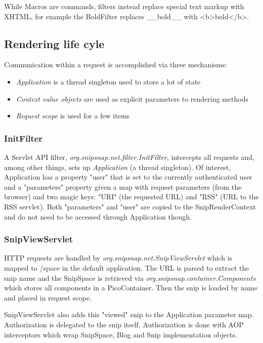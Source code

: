 \documentclass[a4paper,pdftex]{article}
\begin{document}
While Macros are commands, filters instead replace special text markup with
XHTML, for example the BoldFilter replaces \_\_bold\_\_ with <b>bold</b>.

\subsection{Rendering life cyle}

Communication within a request is accomplished via three mechanisms:
\begin{itemize}
\item \textit{Application} is a thread singleton used to store a lot of state
\item \textit{Context value objects} are used as explicit parameters to rendering methods
\item \textit{Request scope} is used for a few items
\end{itemize}

\subsubsection{InitFilter}
A Servlet API filter, \textit{org.snipsnap.net.filter.InitFilter}, intercepts all requests and, 
among other things, sets up \textit{Application} (a thread singleton).  
Of interest, Application has a property "user" that is set to the currently authenticated user 
and a "parameters" property given a map with request parameters (from the browser) 
and two magic keys: "URI" (the requested URL) and "RSS" (URL to the RSS servlet). 
Both "parameters" and "user" are copied to the SnipRenderContext and do not need
to be accessed through Application though.

\subsubsection{SnipViewServlet}
HTTP requests are handled by \textit{org.snipsnap.net.SnipViewServlet} which is
mapped to /space in the default application.  The URL is parsed to extract the snip name and
the SnipSpace is retrieved via \textit{org.snipsnap.container.Components} which stores
all components in a PicoContainer. Then the snip is loaded by name  and 
placed in request scope.

SnipViewServlet also adds this "viewed" snip to the Application parameter map.  
Authorization is delegated to the snip itself. Authorization is done with AOP interceptors
which wrap SnipSpace, Blog and Snip implementation objects.
\end{document}
